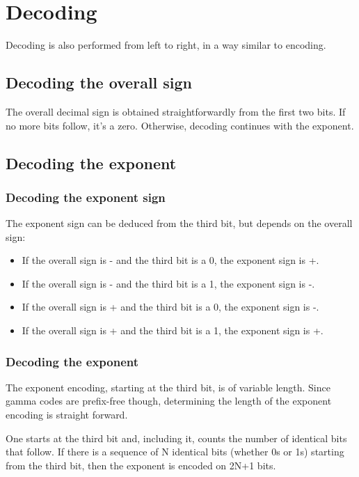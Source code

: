 \documentclass{acm_proc_article-sp}
\begin{document}
\section{Decoding}

Decoding is also performed from left to right, in a way similar to encoding.

\subsection{Decoding the overall sign}

The overall decimal sign is obtained straightforwardly from the first two bits. If no more bits follow, it's a zero. Otherwise, decoding continues with the exponent.

\subsection{Decoding the exponent}

\subsubsection{Decoding the exponent sign}

The exponent sign can be deduced from the third bit, but depends on the overall sign:

\begin{itemize}
\item If the overall sign is - and the third bit is a 0, the exponent sign is +.
\item If the overall sign is - and the third bit is a 1, the exponent sign is -.
\item If the overall sign is + and the third bit is a 0, the exponent sign is -.
\item If the overall sign is + and the third bit is a 1, the exponent sign is +.
\end{itemize}

\subsubsection{Decoding the exponent}

The exponent encoding, starting at the third bit, is of variable length. Since gamma codes are prefix-free though, determining the length of the exponent encoding is straight forward.

One starts at the third bit and, including it, counts the number of identical bits that follow. If there is a sequence of N identical bits (whether 0s or 1s) starting from the third bit, then the exponent is encoded on 2N+1 bits.
\end{document}
